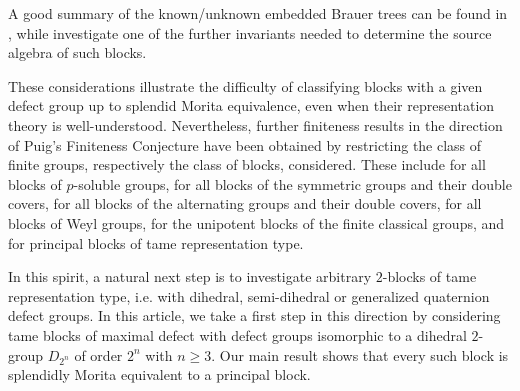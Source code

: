 \documentclass[11pt,a4paper,twoside]{amsart}
\newcommand{\cO}{{\mathcal{O}}}
\theoremstyle{defnew}
\theoremstyle{remark}
\theoremstyle{plain}
\begin{document}
A good summary of the known/unknown embedded Brauer trees can be found in \cite[Chapter 5]{CravenRepBook}, while   \cite{HissLassueur24, HissLassueur25, HissLassueur26} investigate one of the further invariants needed to determine the source algebra of such blocks.
\par
These considerations illustrate the difficulty of classifying blocks with a given defect group up to splendid Morita equivalence, even when their representation theory is well-understood.
Nevertheless, further finiteness results in the direction of Puig's Finiteness Conjecture have been obtained by restricting the class
of finite groups, respectively the class of blocks, considered. These include \cite{PuigNilpotentBlocks88} for all blocks of $p$-soluble
groups, \cite{Pui94, Kes96} for all blocks of the symmetric groups and their double covers, \cite{Kes96, Kes02}
for all blocks of the alternating groups and their double covers, \cite{Kes00} for all blocks of Weyl groups,
\cite{HK05, HK00, Kes01} for the unipotent blocks of the finite classical groups, and \cite{KoLa19,KL20,KLS21} for principal blocks of tame representation type. 
\par
In this spirit, a natural next step is to investigate arbitrary $2$-blocks of tame representation type, i.e. with dihedral, semi-dihedral or generalized quaternion defect groups. In this article, we take a first step in this direction by considering tame blocks of maximal defect with defect groups isomorphic to a dihedral $2$-group $D^{}_{2^n}$ of order $2^n$ with $n\geq 3$.  Our main result shows that every such block is splendidly Morita equivalent to a principal block. 


\end{document}
